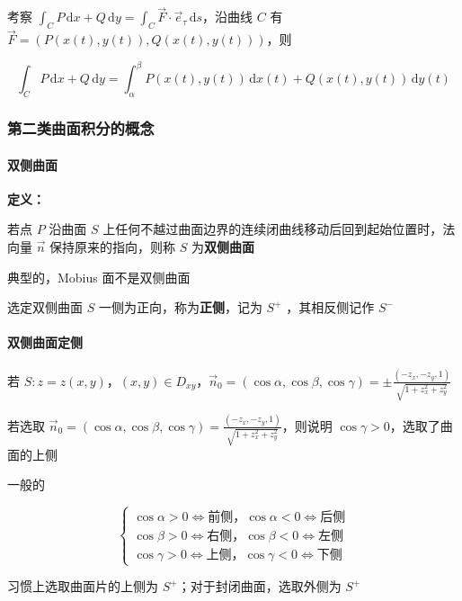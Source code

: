 \documentclass[lang = zh , final , oneside , openany , titlepage , zihao = -4 , linespread = 1.3 , baselineskip = false , cjk-font = windows , text-font = newtx , math-font = newtx]{sjtureport}
\begin{document}
考察 \(\int_C P\,\mathrm{d}x + Q\,\mathrm{d}y = \int_C \vec{F}\cdot\vec{e}_\tau \,\mathrm{d}s\)，沿曲线 \(C\) 有 \(\vec{F} = \left(P\left(x(t),y(t)\right),Q\left(x(t),y(t)\right)\right)\)，则

\[
\int_C P\,\mathrm{d}x + Q\,\mathrm{d}y = \int_\alpha^\beta P\left(x(t),y(t)\right)\,\mathrm{d}x(t) + Q\left(x(t),y(t)\right)\,\mathrm{d}y(t)
\]

\subsubsection{第二类曲面积分的概念}

\paragraph{双侧曲面}

\textbf{定义：}

若点 \(P\) 沿曲面 \(S\) 上任何不越过曲面边界的连续闭曲线移动后回到起始位置时，法向量 \(\vec{n}\) 保持原来的指向，则称 \(S\) 为\textbf{双侧曲面}

典型的，Mobius 面不是双侧曲面

选定双侧曲面 \(S\) 一侧为正向，称为\textbf{正侧}，记为 \(S^+\) ，其相反侧记作 \(S^-\)

\paragraph{双侧曲面定侧}

若 \(S:z = z(x,y)\)，\((x,y)\in D_{xy}\)，\(\vec{n}_0=\left(\cos\alpha,\cos\beta,\cos\gamma\right)=\pm\frac{\left(-z_x,-z_y,1\right)}{\sqrt{1 + z_x^2 + z_y^2}}\)

若选取 \(\vec{n}_0=\left(\cos\alpha,\cos\beta,\cos\gamma\right)=\frac{\left(-z_x,-z_y,1\right)}{\sqrt{1 + z_x^2 + z_y^2}}\)，则说明 \(\cos\gamma > 0\)，选取了曲面的上侧

一般的

\[
\begin{cases}
  \cos\alpha > 0 \Leftrightarrow \text{前侧}，\cos\alpha < 0 \Leftrightarrow \text{后侧}\\
  \cos\beta > 0 \Leftrightarrow \text{右侧}，\cos\beta < 0 \Leftrightarrow \text{左侧}\\
  \cos\gamma > 0 \Leftrightarrow \text{上侧}，\cos\gamma < 0 \Leftrightarrow \text{下侧}
\end{cases}
\]

习惯上选取曲面片的上侧为 \(S^+\)；对于封闭曲面，选取外侧为 \(S^+\)
\end{document}
